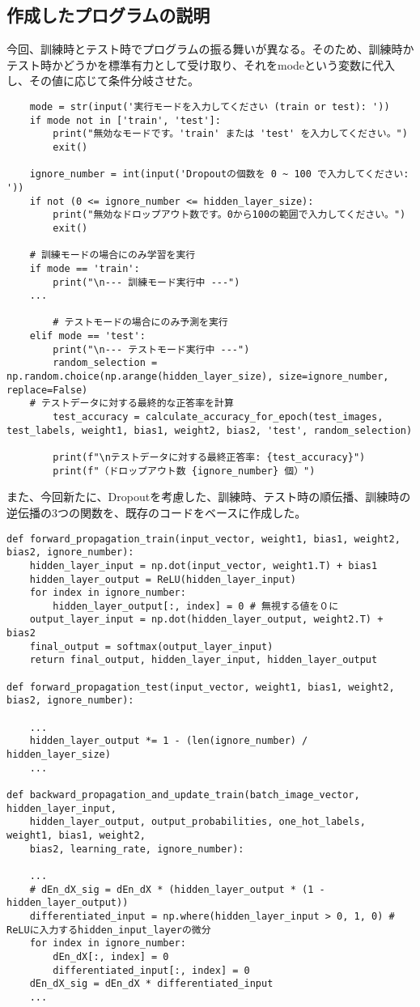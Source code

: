 \documentclass[11px,a4,dvipdfmx]{jsarticle}
\begin{document}
\subsection{作成したプログラムの説明}
今回、訓練時とテスト時でプログラムの振る舞いが異なる。そのため、訓練時かテスト時かどうかを標準有力として受け取り、それをmodeという変数に代入し、その値に応じて条件分岐させた。
\begin{verbatim}
    mode = str(input('実行モードを入力してください (train or test): '))
    if mode not in ['train', 'test']:
        print("無効なモードです。'train' または 'test' を入力してください。")
        exit()

    ignore_number = int(input('Dropoutの個数を 0 ~ 100 で入力してください: '))
    if not (0 <= ignore_number <= hidden_layer_size):
        print("無効なドロップアウト数です。0から100の範囲で入力してください。")
        exit()

    # 訓練モードの場合にのみ学習を実行
    if mode == 'train':
        print("\n--- 訓練モード実行中 ---")
    ...
    
        # テストモードの場合にのみ予測を実行
    elif mode == 'test':
        print("\n--- テストモード実行中 ---")
        random_selection = np.random.choice(np.arange(hidden_layer_size), size=ignore_number, replace=False)
    # テストデータに対する最終的な正答率を計算
        test_accuracy = calculate_accuracy_for_epoch(test_images, test_labels, weight1, bias1, weight2, bias2, 'test', random_selection)

        print(f"\nテストデータに対する最終正答率: {test_accuracy}")
        print(f"（ドロップアウト数 {ignore_number} 個）")
\end{verbatim}
また、今回新たに、Dropoutを考慮した、訓練時、テスト時の順伝播、訓練時の逆伝播の3つの関数を、既存のコードをベースに作成した。
\begin{verbatim}
def forward_propagation_train(input_vector, weight1, bias1, weight2, bias2, ignore_number):
    hidden_layer_input = np.dot(input_vector, weight1.T) + bias1
    hidden_layer_output = ReLU(hidden_layer_input)
    for index in ignore_number:
        hidden_layer_output[:, index] = 0 # 無視する値を０に
    output_layer_input = np.dot(hidden_layer_output, weight2.T) + bias2
    final_output = softmax(output_layer_input)
    return final_output, hidden_layer_input, hidden_layer_output  

def forward_propagation_test(input_vector, weight1, bias1, weight2, bias2, ignore_number):
    
    ...
    hidden_layer_output *= 1 - (len(ignore_number) / hidden_layer_size)
    ...

def backward_propagation_and_update_train(batch_image_vector, hidden_layer_input, 
    hidden_layer_output, output_probabilities, one_hot_labels,  weight1, bias1, weight2, 
    bias2, learning_rate, ignore_number):

    ...
    # dEn_dX_sig = dEn_dX * (hidden_layer_output * (1 - hidden_layer_output))
    differentiated_input = np.where(hidden_layer_input > 0, 1, 0) # ReLUに入力するhidden_input_layerの微分
    for index in ignore_number:
        dEn_dX[:, index] = 0 
        differentiated_input[:, index] = 0 
    dEn_dX_sig = dEn_dX * differentiated_input 
    ...
\end{verbatim}
\end{document}
